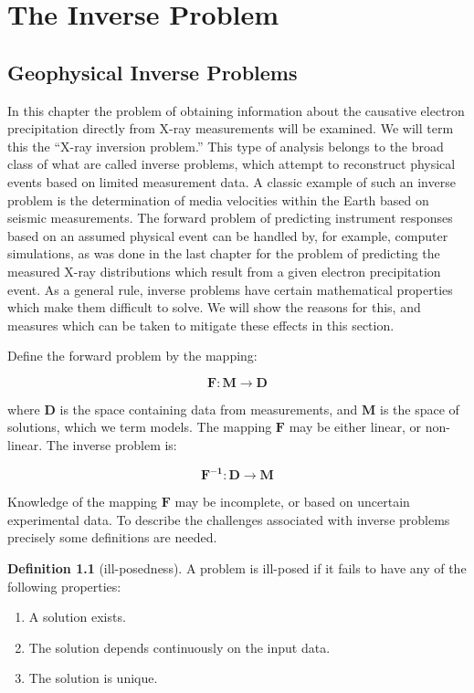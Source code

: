 \chapter{The Inverse Problem}

\section{Geophysical Inverse Problems}

In this chapter the problem of obtaining information about the causative electron precipitation directly from X-ray measurements will be examined. We will term this the ``X-ray inversion problem.'' This type of analysis belongs to the broad class of what are called inverse problems, which attempt to reconstruct physical events based on limited measurement data.  A classic example of such an inverse problem is the determination of media velocities within the Earth based on seismic measurements. The forward problem of predicting instrument responses based on an assumed physical event can be handled by, for example, computer simulations, as was done in the last chapter for the problem of predicting the measured X-ray distributions which result from a given electron precipitation event. As a general rule, inverse problems have certain mathematical properties which make them difficult to solve. We will show the reasons for this, and measures which can be taken to mitigate these effects in this section.

Define the forward problem by the mapping:

\begin{equation}
\mathbf{F}:\mathbf{M} \rightarrow \mathbf{D}
\end{equation}

where $\mathbf{D}$ is the space containing data from measurements, and $\mathbf{M}$ is the space of solutions, which we term models. The mapping $\mathbf{F}$ may be either linear, or non-linear. The inverse problem is:

\begin{equation}
\mathbf{F^{-1}}:\mathbf{D} \rightarrow \mathbf{M}
\end{equation}

 Knowledge of the mapping $\mathbf{F}$ may be incomplete, or based on uncertain experimental data. To describe the challenges associated with inverse problems precisely some definitions are needed.

\theoremstyle{definition}
\newtheorem{definition}{Definition}[section]
\begin{definition}[ill-posedness]
A problem is ill-posed if it fails to have any of the following properties:
\begin{enumerate}
    \item A solution exists.
    \item The solution depends continuously on the input data.
    \item The solution is unique.
\end{enumerate}
\end{definition}

